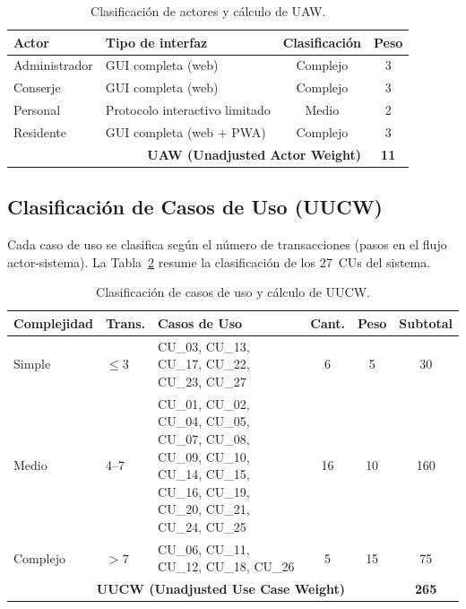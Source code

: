 \begin{table}[H]
\centering
\begin{tabular}{|p{}|p{}|c|c|}
\hline
\textbf{Actor} & \textbf{Tipo de interfaz} & \textbf{Clasificación} & \textbf{Peso} \\
\hline
Administrador & GUI completa (web) & Complejo & 3 \\
\hline
Conserje & GUI completa (web) & Complejo & 3 \\
\hline
Personal & Protocolo interactivo limitado & Medio & 2 \\
\hline
Residente & GUI completa (web + PWA) & Complejo & 3 \\
\hline
\multicolumn{3}{|r|}{\textbf{UAW (Unadjusted Actor Weight)}} & \textbf{11} \\
\hline
\end{tabular}
\caption{Clasificación de actores y cálculo de UAW.}
\label{tab:uaw}
\end{table}

\subsection{Clasificación de Casos de Uso (UUCW)}

Cada caso de uso se clasifica según el número de transacciones (pasos en el flujo actor-sistema). La Tabla~\ref{tab:uucw} resume la clasificación de los 27~CUs del sistema.

\begin{table}[H]
\centering
\begin{tabular}{|p{}|p{}|p{}|c|c|c|}
\hline
\textbf{Complejidad} & \textbf{Trans.} & \textbf{Casos de Uso} & \textbf{Cant.} & \textbf{Peso} & \textbf{Subtotal} \\
\hline
Simple & $\leq 3$ & CU\_03, CU\_13, CU\_17, CU\_22, CU\_23, CU\_27 & 6 & 5 & 30 \\
\hline
Medio & 4--7 & CU\_01, CU\_02, CU\_04, CU\_05, CU\_07, CU\_08, CU\_09, CU\_10, CU\_14, CU\_15, CU\_16, CU\_19, CU\_20, CU\_21, CU\_24, CU\_25 & 16 & 10 & 160 \\
\hline
Complejo & $> 7$ & CU\_06, CU\_11, CU\_12, CU\_18, CU\_26 & 5 & 15 & 75 \\
\hline
\multicolumn{4}{|r|}{\textbf{UUCW (Unadjusted Use Case Weight)}} & & \textbf{265} \\
\hline
\end{tabular}
\caption{Clasificación de casos de uso y cálculo de UUCW.}
\label{tab:uucw}
\end{table}

